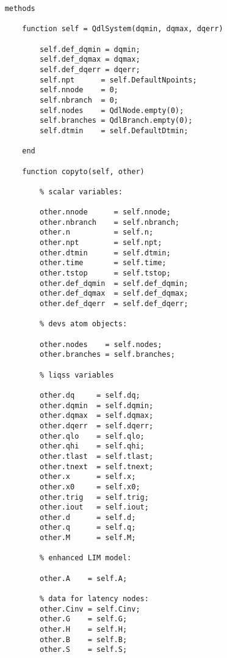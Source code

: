 \begin{lstlisting}
    methods
        
        function self = QdlSystem(dqmin, dqmax, dqerr)
            
            self.def_dqmin = dqmin;
            self.def_dqmax = dqmax;
            self.def_dqerr = dqerr;
            self.npt      = self.DefaultNpoints;   
            self.nnode    = 0;
            self.nbranch  = 0;    
            self.nodes    = QdlNode.empty(0);
            self.branches = QdlBranch.empty(0);            
            self.dtmin    = self.DefaultDtmin;

        end
        
        function copyto(self, other)
            
            % scalar variables:
        
            other.nnode      = self.nnode;      
            other.nbranch    = self.nbranch;    
            other.n          = self.n;          
            other.npt        = self.npt;        
            other.dtmin      = self.dtmin;      
            other.time       = self.time;       
            other.tstop      = self.tstop;      
            other.def_dqmin  = self.def_dqmin;  
            other.def_dqmax  = self.def_dqmax;  
            other.def_dqerr  = self.def_dqerr;  
            
            % devs atom objects:
            
            other.nodes    = self.nodes;
            other.branches = self.branches;
            
            % liqss variables 
            
            other.dq     = self.dq;    
            other.dqmin  = self.dqmin;  
            other.dqmax  = self.dqmax;  
            other.dqerr  = self.dqerr;  
            other.qlo    = self.qlo;    
            other.qhi    = self.qhi;    
            other.tlast  = self.tlast;  
            other.tnext  = self.tnext;  
            other.x      = self.x;      
            other.x0     = self.x0;     
            other.trig   = self.trig;   
            other.iout   = self.iout;   
            other.d      = self.d;
            other.q      = self.q;
            other.M      = self.M;
            
            % enhanced LIM model:
            
            other.A    = self.A;
            
            % data for latency nodes: 
            other.Cinv = self.Cinv;
            other.G    = self.G;   
            other.H    = self.H;   
            other.B    = self.B;  
            other.S    = self.S;   
            

\end{lstlisting}
